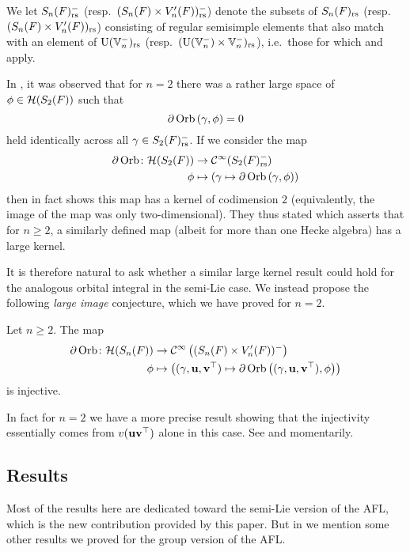 We let $S_n(F)_{\mathrm{rs}}^-$ (resp.\ $(S_n(F) \times V'_n(F))_{\mathrm{rs}}^-$)
denote the subsets of $S_n(F)_{\mathrm{rs}}$ (resp.\ $(S_n(F) \times V'_n(F))_{\mathrm{rs}}$)
consisting of regular semisimple elements that also match with an element of
$\operatorname{U}(\mathbb V_n^-)_{\mathrm{rs}}$ (resp.\ $(\operatorname{U}(\mathbb V_n^-) \times \mathbb V_n^-)_{\mathrm{rs}}$),
i.e.\ those for which 
and  apply.

In \cite{ref:AFLspherical}, it was observed that for $n = 2$
there was a rather large space of $\phi \in \mathcal H(S_2(F))$ such that
\[ \partial \operatorname{Orb} \left(\gamma, \phi \right) = 0 \]
held identically across all $\gamma \in S_2(F)_{\mathrm{rs}}^-$.
If we consider the map
\begin{align*}
  \partial\operatorname{Orb} \colon \mathcal H(S_2(F)) &\to \mathcal{C}^\infty(S_2(F)_{\mathrm{rs}}^-) \\
  \phi &\mapsto \left( \gamma \mapsto \partial \operatorname{Orb} \left(\gamma, \phi \right) \right)
\end{align*}
then \cite[Theorem 8.2.3]{ref:AFLspherical} in fact
shows this map has a kernel of codimension $2$
(equivalently, the image of the map was only two-dimensional).
They thus stated \cite[Conjecture 1.0.2]{ref:AFLspherical} which asserts that for $n \ge 2$,
a similarly defined map (albeit for more than one Hecke algebra) has a large kernel.

It is therefore natural to ask whether a similar large kernel result
could hold for the analogous orbital integral in the semi-Lie case.
We instead propose the following \emph{large image} conjecture,
which we have proved for $n = 2$.
\begin{conjecture}
  \label{conj:kernel_semi_lie}
  Let $n \ge 2$.
  The map
  \begin{align*}
    \partial\operatorname{Orb} \colon \mathcal H(S_n(F)) &\to \mathcal{C}^\infty\left( (S_n(F) \times V'_n(F))^- \right) \\
    \phi &\mapsto \left( {(\gamma, \mathbf u, \mathbf v^\top)} \mapsto \partial \operatorname{Orb} \left({(\gamma, \mathbf u, \mathbf v^\top)}, \phi \right) \right)
  \end{align*}
  is injective.
\end{conjecture}
In fact for $n=2$ we have a more precise result
showing that the injectivity essentially comes from $v(\mathbf u\mathbf v^\top)$ alone in this case.
See  and  momentarily.

\subsection{Results}
Most of the results here are dedicated toward the semi-Lie version of the AFL,
which is the new contribution provided by this paper.
But in  we mention some other results
we proved for the group version of the AFL.

